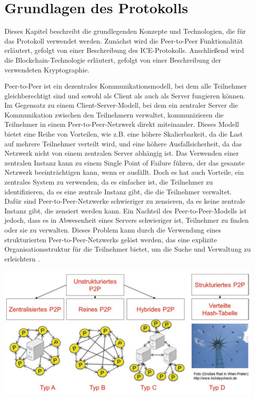 \section{Grundlagen des Protokolls}
\label{sec:grundlagen_des_protokolls}

Dieses Kapitel beschreibt die grundlegenden Konzepte und Technologien, die für das Protokoll verwendet werden. Zunächst wird die Peer-to-Peer Funktionalität erläutert, gefolgt von einer Beschreibung des ICE-Protokolls. Anschließend wird die Blockchain-Technologie erläutert, gefolgt von einer Beschreibung der verwendeten Kryptographie.

Peer-to-Peer ist ein dezentrales Kommunikationsmodell, bei dem alle Teilnehmer gleichberechtigt sind und sowohl als Client als auch als Server fungieren können. Im Gegensatz zu einem Client-Server-Modell, bei dem ein zentraler Server die Kommunikation zwischen den Teilnehmern verwaltet, kommunizieren die Teilnehmer in einem Peer-to-Peer-Netzwerk direkt miteinander. Dieses Modell bietet eine Reihe von Vorteilen, wie z.B. eine höhere Skalierbarkeit, da die Last auf mehrere Teilnehmer verteilt wird, und eine höhere Ausfallsicherheit, da das Netzwerk nicht von einem zentralen Server abhängig ist. 
Das Verwenden einer zentralen Instanz kann zu einem Single Point of Failure führen, der das gesamte Netzwerk beeinträchtigen kann, wenn er ausfällt. Doch es hat auch Vorteile, ein zentrales System zu verwenden, da es einfacher ist, die Teilnehmer zu identifizieren, da es eine zentrale Instanz gibt, die die Teilnehmer verwaltet. Dafür sind Peer-to-Peer-Netzwerke schwieriger zu zensieren, da es keine zentrale Instanz gibt, die zensiert werden kann. Ein Nachteil des Peer-to-Peer-Modells ist jedoch, dass es in Abwesenheit eines Servers schwieriger ist, Teilnehmer zu finden oder sie zu verwalten. Dieses Problem kann durch die Verwendung eines strukturierten Peer-to-Peer-Netzwerks gelöst werden, das eine explizite Organisationsstruktur für die Teilnehmer bietet, um die Suche und Verwaltung zu erleichtern \parencite{Luntovskyy_ModRechnernetze}.

\begin{center}
    \captionsetup{type=figure}
    \includegraphics[width=1\linewidth]{images/peer_to_peer_typen.png}
    \label{p2p_typen}
\end{center}

